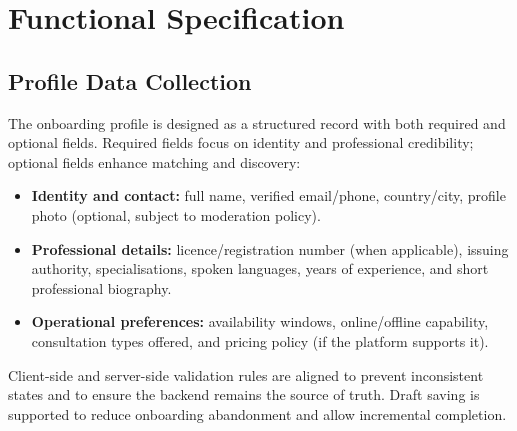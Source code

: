 \documentclass[a4paper,12pt]{report}
\begin{document}
\section{Functional Specification}
\label{sec:sprint2-functional}

\subsection{Profile Data Collection}
\label{sec:uc-profile}

The onboarding profile is designed as a structured record with both required
and optional fields. Required fields focus on identity and professional
credibility; optional fields enhance matching and discovery:

\begin{itemize}
    \item \textbf{Identity and contact:} full name, verified email/phone,
    country/city, profile photo (optional, subject to moderation policy).
    \item \textbf{Professional details:} licence/registration number (when
    applicable), issuing authority, specialisations, spoken languages, years of
    experience, and short professional biography.
    \item \textbf{Operational preferences:} availability windows, online/offline
    capability, consultation types offered, and pricing policy (if the platform
    supports it).
\end{itemize}

Client-side and server-side validation rules are aligned to prevent inconsistent
states and to ensure the backend remains the source of truth. Draft saving is
supported to reduce onboarding abandonment and allow incremental completion.

\end{document}
